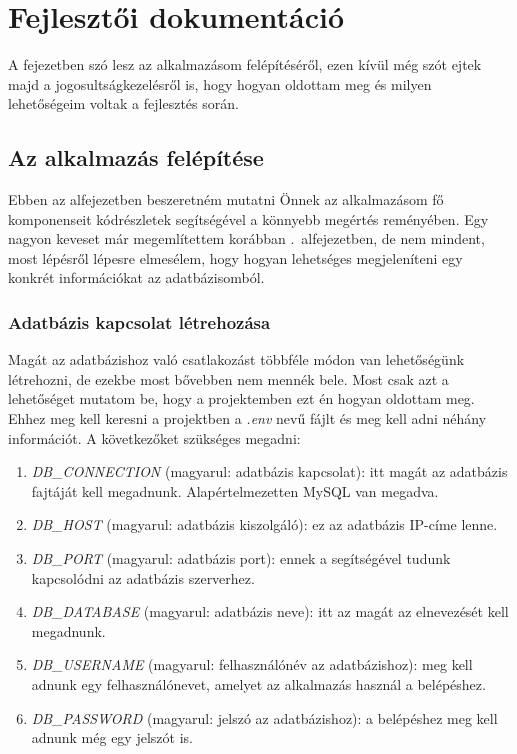 \documentclass[]{thesis-ekf}
\theoremstyle{definition}
\theoremstyle{remark}
\begin{document}
	\chapter{Fejlesztői dokumentáció}
		A fejezetben szó lesz az alkalmazásom felépítéséről, ezen kívül még szót ejtek majd a jogosultságkezelésről is, hogy hogyan oldottam meg és milyen lehetőségeim voltak a fejlesztés során.
	\section{Az alkalmazás felépítése}
		Ebben az alfejezetben beszeretném mutatni Önnek az alkalmazásom fő komponenseit kódrészletek segítségével a könnyebb megértés reményében. Egy nagyon keveset már megemlítettem korábban .~alfejezetben, de nem mindent, most lépésről lépesre elmesélem, hogy hogyan lehetséges megjeleníteni egy konkrét információkat az adatbázisomból.
	\subsection{Adatbázis kapcsolat létrehozása}
		Magát az adatbázishoz való csatlakozást többféle módon van lehetőségünk létrehozni, de ezekbe most bővebben nem mennék bele. Most csak azt a lehetőséget mutatom be, hogy a projektemben ezt én hogyan oldottam meg. Ehhez meg kell keresni a projektben a \emph{.env} nevű fájlt és meg kell adni néhány információt. A következőket szükséges megadni:
		\begin{enumerate}
			\item \emph{DB\_CONNECTION} (magyarul: adatbázis kapcsolat): itt magát az adatbázis fajtáját kell megadnunk. Alapértelmezetten MySQL van megadva. 
			\item \emph{DB\_HOST} (magyarul: adatbázis kiszolgáló): ez az adatbázis IP-címe lenne.
			\item \emph{DB\_PORT} (magyarul: adatbázis port): ennek a segítségével tudunk kapcsolódni az adatbázis szerverhez. 
			\item \emph{DB\_DATABASE} (magyarul: adatbázis neve): itt az magát az elnevezését kell megadnunk.
			\item \emph{DB\_USERNAME} (magyarul: felhasználónév az adatbázishoz): meg kell adnunk egy felhasználónevet, amelyet az alkalmazás használ a belépéshez.
			\item \emph{DB\_PASSWORD} (magyarul: jelszó az adatbázishoz): a belépéshez meg kell adnunk még egy jelszót is.
		\end{enumerate}
\end{document}
